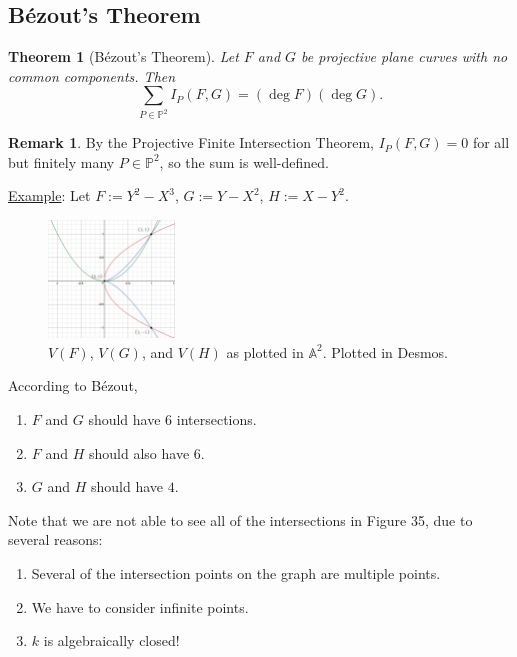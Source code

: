 \documentclass[12pt]{article}
\newtheorem{theorem}{Theorem}[section]
\theoremstyle{definition}
\newtheorem*{remark}{Remark}
\begin{document}
\subsection{B\'ezout's Theorem}
\begin{theorem}[B\'ezout's Theorem]
    Let $F$ and $G$ be projective plane curves with no common components. Then
    \begin{equation}
        \boxed{\sum\limits_{P\in\mathbb{P}^2}I_P(F,G)=(\deg F)(\deg G).}
    \end{equation}
\end{theorem}
\begin{remark}
   By the Projective Finite Intersection Theorem, $I_P(F,G)=0$ for all but finitely many $P\in\mathbb{P}^2$, so the sum is well-defined.
\end{remark}
\underline{Example}: Let $F:=Y^2-X^3$, $G:=Y-X^2$, $H:=X-Y^2$.
\begin{figure}[H]
    \centering
    \includegraphics[width=0.3\textwidth]{35.png}
    \caption{$V(F)$, $V(G)$, and $V(H)$ as plotted in $\mathbb{A}^2$. Plotted in Desmos.}
\end{figure}
According to B\'ezout,
\begin{enumerate}
    \item $F$ and $G$ should have $\boxed{6}$ intersections.
    \item $F$ and $H$ should also have $\boxed{6.}$
    \item $G$ and $H$ should have $\boxed{4.}$
\end{enumerate}
Note that we are not able to see all of the intersections in Figure 35, due to several reasons:
\begin{enumerate}
    \item Several of the intersection points on the graph are multiple points.
    \item We have to consider infinite points.
    \item $k$ is algebraically closed!
\end{enumerate}
\end{document}
